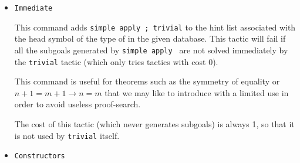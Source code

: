 \begin{coq_example*}
\begin{itemize}

\item \texttt{Immediate {\term}}

  This command adds {\tt simple apply {\term}; trivial} to the hint list
  associated with the head symbol of the type of {\ident} in the given
  database. This tactic will fail if all the subgoals generated by
  {\tt simple apply {\term}} are not solved immediately by the {\tt trivial}
  tactic (which only tries tactics with cost $0$).

  This command is useful for theorems such as the symmetry of equality
  or $n+1=m+1 \to n=m$ that we may like to introduce with a
  limited use in order to avoid useless proof-search.

  The cost of this tactic (which never generates subgoals) is always 1,
  so that it is not used by {\tt trivial} itself.



\item \texttt{Constructors} {\ident}


\end{itemize}
\end{coq_example*}
